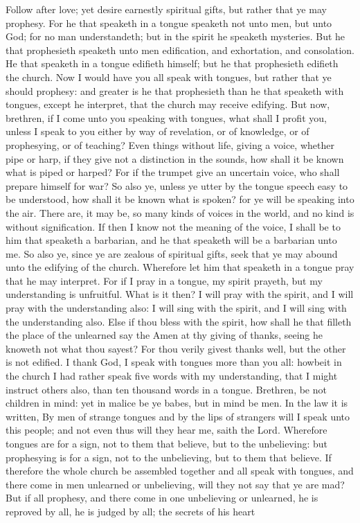Follow after love; yet desire earnestly spiritual gifts, but rather that ye may prophesy. For he that speaketh in a tongue speaketh not unto men, but unto God; for no man understandeth; but in the spirit he speaketh mysteries. But he that prophesieth speaketh unto men edification, and exhortation, and consolation. He that speaketh in a tongue edifieth himself; but he that prophesieth edifieth the church. Now I would have you all speak with tongues, but rather that ye should prophesy: and greater is he that prophesieth than he that speaketh with tongues, except he interpret, that the church may receive edifying. But now, brethren, if I come unto you speaking with tongues, what shall I profit you, unless I speak to you either by way of revelation, or of knowledge, or of prophesying, or of teaching? Even things without life, giving a voice, whether pipe or harp, if they give not a distinction in the sounds, how shall it be known what is piped or harped? For if the trumpet give an uncertain voice, who shall prepare himself for war? So also ye, unless ye utter by the tongue speech easy to be understood, how shall it be known what is spoken? for ye will be speaking into the air. There are, it may be, so many kinds of voices in the world, and no kind is without signification. If then I know not the meaning of the voice, I shall be to him that speaketh a barbarian, and he that speaketh will be a barbarian unto me. So also ye, since ye are zealous of spiritual gifts, seek that ye may abound unto the edifying of the church. Wherefore let him that speaketh in a tongue pray that he may interpret. For if I pray in a tongue, my spirit prayeth, but my understanding is unfruitful. What is it then? I will pray with the spirit, and I will pray with the understanding also: I will sing with the spirit, and I will sing with the understanding also. Else if thou bless with the spirit, how shall he that filleth the place of the unlearned say the Amen at thy giving of thanks, seeing he knoweth not what thou sayest? For thou verily givest thanks well, but the other is not edified. I thank God, I speak with tongues more than you all: howbeit in the church I had rather speak five words with my understanding, that I might instruct others also, than ten thousand words in a tongue.  Brethren, be not children in mind: yet in malice be ye babes, but in mind be men. In the law it is written, By men of strange tongues and by the lips of strangers will I speak unto this people; and not even thus will they hear me, saith the Lord. Wherefore tongues are for a sign, not to them that believe, but to the unbelieving: but prophesying is for a sign, not to the unbelieving, but to them that believe. If therefore the whole church be assembled together and all speak with tongues, and there come in men unlearned or unbelieving, will they not say that ye are mad? But if all prophesy, and there come in one unbelieving or unlearned, he is reproved by all, he is judged by all; the secrets of his heart 
